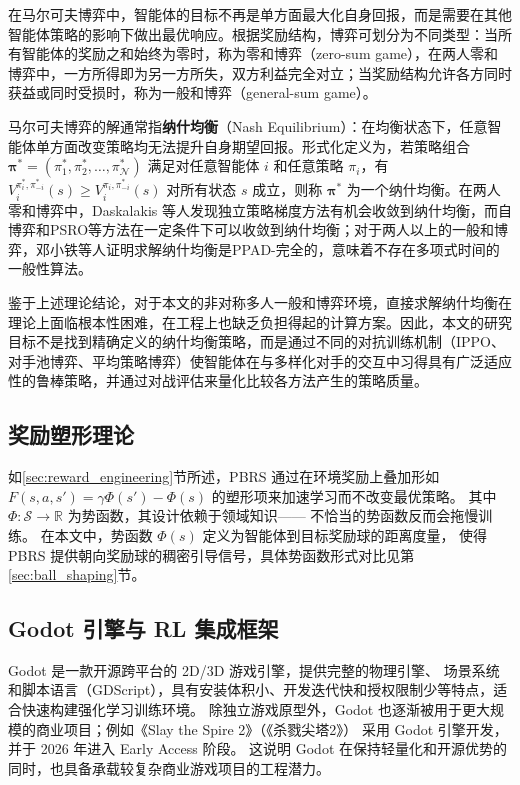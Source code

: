 \documentclass[12pt, a4paper, UTF8]{ctexart}
\numberwithin{equation}{section}
\begin{document}
在马尔可夫博弈中，智能体的目标不再是单方面最大化自身回报，而是需要在其他智能体策略的影响下做出最优响应。根据奖励结构，博弈可划分为不同类型：当所有智能体的奖励之和始终为零时，称为零和博弈（zero-sum game），在两人零和博弈中，一方所得即为另一方所失，双方利益完全对立；当奖励结构允许各方同时获益或同时受损时，称为一般和博弈（general-sum game）。

马尔可夫博弈的解通常指\textbf{纳什均衡}（Nash Equilibrium）：在均衡状态下，任意智能体单方面改变策略均无法提升自身期望回报。形式化定义为，若策略组合 $\boldsymbol{\pi}^* = (\pi_1^*, \pi_2^*, \dots, \pi_\mathcal{N}^*)$ 满足对任意智能体 $i$ 和任意策略 $\pi_i$，有 $V_i^{\pi_i^*, \pi_{-i}^*}(s) \geq V_i^{\pi_i, \pi_{-i}^*}(s)$ 对所有状态 $s$ 成立，则称 $\boldsymbol{\pi}^*$ 为一个纳什均衡。在两人零和博弈中，Daskalakis 等人\cite{daskalakis2021independentpolicygradientmethods}发现独立策略梯度方法有机会收敛到纳什均衡，而自博弈和PSRO等方法在一定条件下可以收敛到纳什均衡\cite{lanctot2017unifiedgametheoreticapproachmultiagent}；对于两人以上的一般和博弈，邓小铁等人\cite{Deng_2022ppad}证明求解纳什均衡是PPAD-完全的，意味着不存在多项式时间的一般性算法。

鉴于上述理论结论，对于本文的非对称多人一般和博弈环境，直接求解纳什均衡在理论上面临根本性困难，在工程上也缺乏负担得起的计算方案。因此，本文的研究目标不是找到精确定义的纳什均衡策略，而是通过不同的对抗训练机制（IPPO、对手池博弈、平均策略博弈）使智能体在与多样化对手的交互中习得具有广泛适应性的鲁棒策略，并通过对战评估来量化比较各方法产生的策略质量。

\subsection{奖励塑形理论}
如\ref{sec:reward_engineering}节所述，PBRS 通过在环境奖励上叠加形如
$F(s,a,s') = \gamma\Phi(s') - \Phi(s)$ 的塑形项来加速学习而不改变最优策略。
其中 $\Phi: \mathcal{S} \to \mathbb{R}$ 为势函数，其设计依赖于领域知识——
不恰当的势函数反而会拖慢训练\cite{10.5555/2832581.2832737pbrs}。
在本文中，势函数 $\Phi(s)$ 定义为智能体到目标奖励球的距离度量，
使得 PBRS 提供朝向奖励球的稠密引导信号，具体势函数形式对比见第\ref{sec:ball_shaping}节。

\subsection{Godot 引擎与 RL 集成框架}
Godot 是一款开源跨平台的 2D/3D 游戏引擎，提供完整的物理引擎、
场景系统和脚本语言（GDScript），具有安装体积小、开发迭代快和授权限制少等特点，适合快速构建强化学习训练环境。
除独立游戏原型外，Godot 也逐渐被用于更大规模的商业项目；例如《Slay the Spire 2》（《杀戮尖塔2》）
采用 Godot 引擎开发，并于 2026 年进入 Early Access 阶段。
这说明 Godot 在保持轻量化和开源优势的同时，也具备承载较复杂商业游戏项目的工程潜力。
\end{document}
